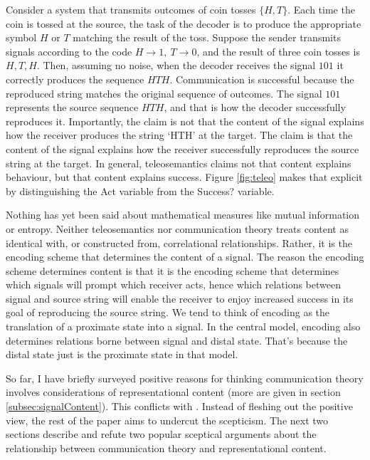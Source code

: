 \documentclass[12pt]{article}
\begin{document}
Consider a system that transmits outcomes of coin tosses $\{H,T\}$.
Each time the coin is tossed at the source, the task of the decoder is to produce the appropriate symbol $H$ or $T$ matching the result of the toss.
Suppose the sender transmits signals according to the code $H\rightarrow1,\ T\rightarrow0$, and the result of three coin tosses is $H, T, H$.
Then, assuming no noise, when the decoder receives the signal $101$ it correctly produces the sequence $HTH$.
Communication is successful because the reproduced string matches the original sequence of outcomes.
The signal $101$ represents the source sequence $HTH$, and that is how the decoder successfully reproduces it.
Importantly, the claim is not that the content of the signal explains how the receiver produces the string `HTH' at the target.
The claim is that the content of the signal explains how the receiver successfully reproduces the source string at the target.
In general, teleosemantics claims not that content explains behaviour, but that content explains success.
Figure \ref{fig:teleo} makes that explicit by distinguishing the Act variable from the Success? variable.

Nothing has yet been said about mathematical measures like mutual information or entropy.
Neither teleosemantics nor communication theory treats content as identical with, or constructed from, correlational relationships.
Rather, it is the encoding scheme that determines the content of a signal.
The reason the encoding scheme determines content is that it is the encoding scheme that determines which signals will prompt which receiver acts, hence which relations between signal and source string will enable the receiver to enjoy increased success in its goal of reproducing the source string.
We tend to think of encoding as the translation of a proximate state into a signal.
In the central model, encoding also determines relations borne between signal and distal state.
That's because the distal state just is the proximate state in that model.

So far, I have briefly surveyed positive reasons for thinking communication theory involves considerations of representational content (more are given in section \ref{subsec:signalContent}).
This conflicts with \tic{}.
Instead of fleshing out the positive view, the rest of the paper aims to undercut the scepticism.
The next two sections describe and refute two popular sceptical arguments about the relationship between communication theory and representational content.
\end{document}
